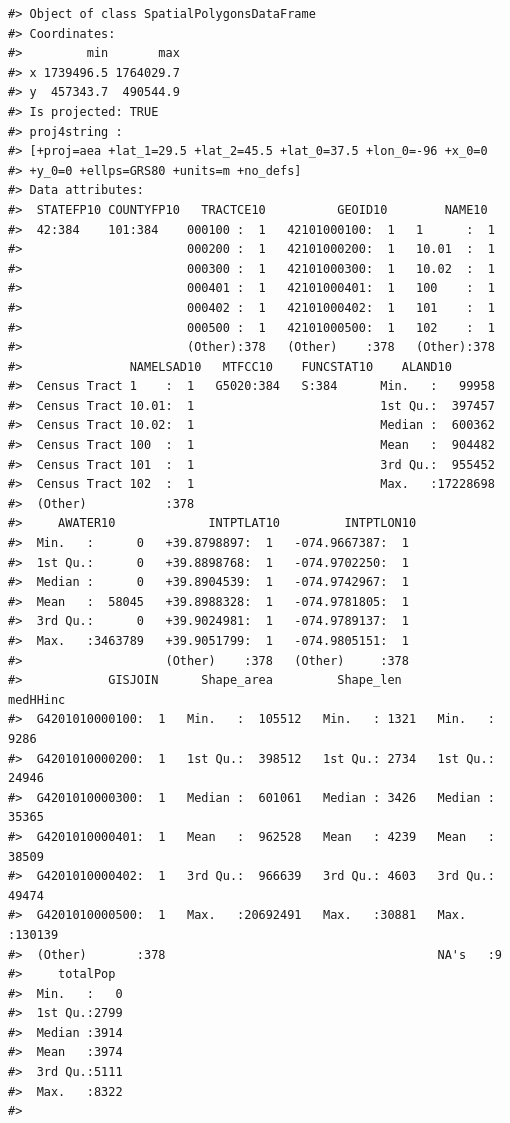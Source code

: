 \documentclass[]{book}
\theoremstyle{definition}
\theoremstyle{definition}
\theoremstyle{definition}
\theoremstyle{remark}
\begin{document}
\begin{verbatim}
#> Object of class SpatialPolygonsDataFrame
#> Coordinates:
#>         min       max
#> x 1739496.5 1764029.7
#> y  457343.7  490544.9
#> Is projected: TRUE 
#> proj4string :
#> [+proj=aea +lat_1=29.5 +lat_2=45.5 +lat_0=37.5 +lon_0=-96 +x_0=0
#> +y_0=0 +ellps=GRS80 +units=m +no_defs]
#> Data attributes:
#>  STATEFP10 COUNTYFP10   TRACTCE10          GEOID10        NAME10   
#>  42:384    101:384    000100 :  1   42101000100:  1   1      :  1  
#>                       000200 :  1   42101000200:  1   10.01  :  1  
#>                       000300 :  1   42101000300:  1   10.02  :  1  
#>                       000401 :  1   42101000401:  1   100    :  1  
#>                       000402 :  1   42101000402:  1   101    :  1  
#>                       000500 :  1   42101000500:  1   102    :  1  
#>                       (Other):378   (Other)    :378   (Other):378  
#>               NAMELSAD10   MTFCC10    FUNCSTAT10    ALAND10        
#>  Census Tract 1    :  1   G5020:384   S:384      Min.   :   99958  
#>  Census Tract 10.01:  1                          1st Qu.:  397457  
#>  Census Tract 10.02:  1                          Median :  600362  
#>  Census Tract 100  :  1                          Mean   :  904482  
#>  Census Tract 101  :  1                          3rd Qu.:  955452  
#>  Census Tract 102  :  1                          Max.   :17228698  
#>  (Other)           :378                                            
#>     AWATER10             INTPTLAT10         INTPTLON10 
#>  Min.   :      0   +39.8798897:  1   -074.9667387:  1  
#>  1st Qu.:      0   +39.8898768:  1   -074.9702250:  1  
#>  Median :      0   +39.8904539:  1   -074.9742967:  1  
#>  Mean   :  58045   +39.8988328:  1   -074.9781805:  1  
#>  3rd Qu.:      0   +39.9024981:  1   -074.9789137:  1  
#>  Max.   :3463789   +39.9051799:  1   -074.9805151:  1  
#>                    (Other)    :378   (Other)     :378  
#>            GISJOIN      Shape_area         Shape_len        medHHinc     
#>  G4201010000100:  1   Min.   :  105512   Min.   : 1321   Min.   :  9286  
#>  G4201010000200:  1   1st Qu.:  398512   1st Qu.: 2734   1st Qu.: 24946  
#>  G4201010000300:  1   Median :  601061   Median : 3426   Median : 35365  
#>  G4201010000401:  1   Mean   :  962528   Mean   : 4239   Mean   : 38509  
#>  G4201010000402:  1   3rd Qu.:  966639   3rd Qu.: 4603   3rd Qu.: 49474  
#>  G4201010000500:  1   Max.   :20692491   Max.   :30881   Max.   :130139  
#>  (Other)       :378                                      NA's   :9       
#>     totalPop   
#>  Min.   :   0  
#>  1st Qu.:2799  
#>  Median :3914  
#>  Mean   :3974  
#>  3rd Qu.:5111  
#>  Max.   :8322  
#> 
\end{verbatim}
\end{document}
